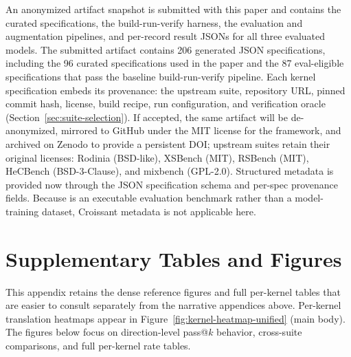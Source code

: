 An anonymized artifact snapshot is submitted with this paper and contains the curated \parbench{} specifications, the build-run-verify harness, the evaluation and augmentation pipelines, and per-record result JSONs for all three evaluated models. The submitted artifact contains 206 generated JSON specifications, including the 96 curated specifications used in the paper and the 87 eval-eligible specifications that pass the baseline build-run-verify pipeline. Each kernel specification embeds its provenance: the upstream suite, repository URL, pinned commit hash, license, build recipe, run configuration, and verification oracle (Section~\ref{sec:suite-selection}). If accepted, the same artifact will be de-anonymized, mirrored to GitHub under the MIT license for the \parbench{} framework, and archived on Zenodo to provide a persistent DOI; upstream suites retain their original licenses: Rodinia (BSD-like), XSBench (MIT), RSBench (MIT), HeCBench (BSD-3-Clause), and mixbench (GPL-2.0). Structured metadata is provided now through the JSON specification schema and per-spec provenance fields. Because \parbench{} is an executable evaluation benchmark rather than a model-training dataset, Croissant metadata is not applicable here.





\section{Supplementary Tables and Figures}
\label{sec:appendix-f}

This appendix retains the dense reference figures and full per-kernel tables
that are easier to consult separately from the narrative appendices above.
Per-kernel translation heatmaps appear in Figure~\ref{fig:kernel-heatmap-unified}
(main body). The figures below focus on direction-level pass@$k$ behavior,
cross-suite comparisons, and full per-kernel rate tables.


%

